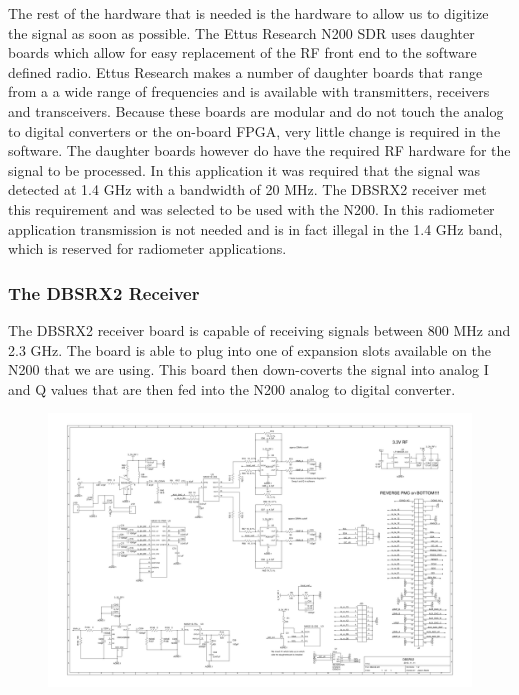 The rest of the hardware that is needed is the hardware to allow us to digitize the signal as soon as possible.  The Ettus Research N200 SDR uses daughter boards which allow for easy replacement of the RF front end to the software defined radio.  Ettus Research makes a number of daughter boards that range from a a wide range of frequencies and is available with transmitters, receivers and transceivers.  Because these boards are modular and do not touch the analog to digital converters or the on-board FPGA, very little change is required in the software.  The daughter boards however do have the required RF hardware for the signal to be processed.  In this application it was required that the signal was detected at 1.4 GHz with a bandwidth of 20 MHz.  The DBSRX2 receiver met this requirement and was selected to be used with the N200.  In this radiometer application transmission is not needed and is in fact illegal in the 1.4 GHz band, which is reserved for radiometer applications.

\subsubsection{The DBSRX2 Receiver}
The DBSRX2 receiver board is capable of receiving signals between 800 MHz and 2.3 GHz.  The board is able to plug into one of expansion slots available on the N200 that we are using.  This board then down-coverts the signal into analog I and Q values that are then fed into the N200 analog to digital converter.

{\begin{figure}[h!tb] 
\centering
\includegraphics{Images/dbsrx2}
\label{dbsrx2}
\end{figure}
}

